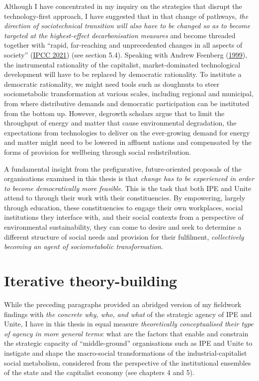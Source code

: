\documentclass[a4paper, nobind]{templates/ociamthesis}
\begin{document}
Although I have concentrated in my inquiry on the strategies that disrupt the technology-first approach, I have suggested that in that change of pathways, \emph{the direction of sociotechnical transition will also have to be changed so as to become targeted at the highest-effect decarbonisation measures} and become threaded together with ``rapid, far-reaching and unprecedented changes in all aspects of society'' (\protect\hyperlink{ref-ipcc_summary_2021}{IPCC 2021}) (see section 5.4). Speaking with Andrew Feenberg (\protect\hyperlink{ref-feenberg_questioning_1999}{1999}), the instrumental rationality of the capitalist, market-dominated technological development will have to be replaced by democratic rationality. To institute a democratic rationality, we might need tools such as doughnuts to steer sociometabolic transformation at various scales, including regional and municipal, from where distributive demands and democratic participation can be instituted from the bottom up. However, degrowth scholars argue that to limit the throughput of energy and matter that cause environmental degradation, the expectations from technologies to deliver on the ever-growing demand for energy and matter might need to be lowered in affluent nations and compensated by the forms of provision for wellbeing through social redistribution.

A fundamental insight from the prefigurative, future-oriented proposals of the organisations examined in this thesis is that \emph{change has to be experienced in order to become democratically more feasible}. This is the task that both IPE and Unite attend to through their work with their constituencies. By empowering, largely through education, these constituencies to engage their own workplaces, social institutions they interface with, and their social contexts from a perspective of environmental sustainability, they can come to desire and seek to determine a different structure of social needs and provision for their fulfilment, \emph{collectively becoming an agent of sociometabolic transformation}.

\hypertarget{iterative-theory-building-1}{%
\section{Iterative theory-building}\label{iterative-theory-building-1}}

While the preceding paragraphs provided an abridged version of my fieldwork findings with \emph{the concrete why, who, and what} of the strategic agency of IPE and Unite, I have in this thesis in equal measure \emph{theoretically conceptualised their type of agency in more general terms}: what are the factors that enable and constrain the strategic capacity of ``middle-ground'' organisations such as IPE and Unite to instigate and shape the macro-social transformations of the industrial-capitalist social metabolism, considered from the perspective of the institutional ensembles of the state and the capitalist economy (see chapters 4 and 5).
\end{document}
